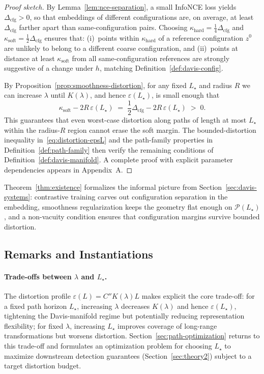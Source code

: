 \documentclass[11pt]{article}
\begin{document}
\begin{proof}[Proof sketch]
By Lemma~\ref{lem:nce-separation}, a small InfoNCE loss yields
$\Delta_{\mathrm{cfg}} > 0$, so that embeddings of different configurations are, on average, at least
$\Delta_{\mathrm{cfg}}$ farther apart than same-configuration pairs. Choosing
$\kappa_{\mathrm{hard}} = \tfrac{1}{4}\Delta_{\mathrm{cfg}}$ and
$\kappa_{\mathrm{soft}} = \tfrac{1}{2}\Delta_{\mathrm{cfg}}$ ensures that:
(i)~points within $\kappa_{\mathrm{hard}}$ of a reference configuration $z^0$ are unlikely to belong
to a different coarse configuration, and (ii)~points at distance at least $\kappa_{\mathrm{soft}}$ from
all same-configuration references are strongly suggestive of a change under $h$,
matching Definition~\ref{def:davis-config}.

By Proposition~\ref{prop:smoothness-distortion}, for any fixed $L_\star$ and radius $R$ we can
increase $\lambda$ until $K(\lambda)$, and hence $\varepsilon(L_\star)$, is small enough that
\[
\kappa_{\mathrm{soft}} - 2R\,\varepsilon(L_\star)
\;=\;
\frac{1}{2}\Delta_{\mathrm{cfg}} - 2R\,\varepsilon(L_\star) \;>\; 0.
\]
This guarantees that even worst-case distortion along paths of length at most $L_\star$ within the
radius-$R$ region cannot erase the soft margin. The bounded-distortion inequality
in~\eqref{eq:distortion-epsL} and the path-family properties in Definition~\ref{def:path-family}
then verify the remaining conditions of Definition~\ref{def:davis-manifold}. A complete proof with
explicit parameter dependencies appears in Appendix~A.
\end{proof}

Theorem~\ref{thm:existence} formalizes the informal picture from
Section~\ref{sec:davis-systems}: contrastive training carves out configuration separation in the
embedding, smoothness regularization keeps the geometry flat enough on $\mathcal{P}(L_\star)$, and
a non-vacuity condition ensures that configuration margins survive bounded distortion.

\subsection{Remarks and Instantiations}
\label{subsec:existence-remarks}

\paragraph{Trade-offs between $\lambda$ and $L_\star$.}
The distortion profile $\varepsilon(L) = C'' K(\lambda) L$ makes explicit the core trade-off:
for a fixed path horizon $L_\star$, increasing $\lambda$ decreases $K(\lambda)$ and hence
$\varepsilon(L_\star)$, tightening the Davis-manifold regime but potentially reducing representation
flexibility; for fixed $\lambda$, increasing $L_\star$ improves coverage of long-range transformations
but worsens distortion. Section~\ref{sec:path-optimization} returns to this trade-off and formulates
an optimization problem for choosing $L_\star$ to maximize downstream detection guarantees
(Section~\ref{sec:theory2}) subject to a target distortion budget.
\end{document}
